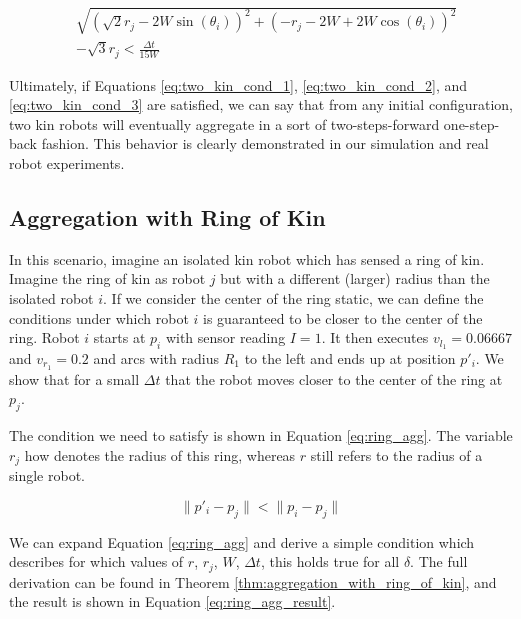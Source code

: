 \documentclass[conference]{IEEEtran}
\begin{document}
    \begin{equation} \label{eq:two_kin_cond_3}
      \begin{split}
        &\sqrt{(\sqrt{2}r_j - 2W\sin(\theta_i))^2 + (-r_j-2W+2W\cos(\theta_i))^2} \\
        & - \sqrt{3}r_j < \frac{\Delta t}{15W}
      \end{split}
    \end{equation}

    Ultimately, if Equations \eqref{eq:two_kin_cond_1}, \eqref{eq:two_kin_cond_2}, and \eqref{eq:two_kin_cond_3} are satisfied, we can say that from any initial configuration, two kin robots will eventually aggregate in a sort of two-steps-forward one-step-back fashion. This behavior is clearly demonstrated in our simulation and real robot experiments.

  \subsection{Aggregation with Ring of Kin}

    In this scenario, imagine an isolated kin robot which has sensed a ring of kin. Imagine the ring of kin as robot $j$ but with a different (larger) radius than the isolated robot $i$. If we consider the center of the ring static, we can define the conditions under which robot $i$ is guaranteed to be closer to the center of the ring. Robot $i$ starts at $p_i$ with sensor reading $I=1$. It then executes $v_{l_1} = 0.06667$ and $v_{r_1} = 0.2$ and arcs with radius $R_1$ to the left and ends up at position $p'_i$. We show that for a small $\Delta t$ that the robot moves closer to the center of the ring at $p_j$.

    The condition we need to satisfy is shown in Equation \eqref{eq:ring_agg}. The variable $r_j$ how denotes the radius of this ring, whereas $r$ still refers to the radius of a single robot.

    \begin{equation} \label{eq:ring_agg}
      \lVert p'_i - p_j \rVert < \lVert p_i - p_j \rVert
    \end{equation}

    We can expand Equation \eqref{eq:ring_agg} and derive a simple condition which describes for which values of $r$, $r_j$, $W$, $\Delta t$, this holds true for all $\delta$. The full derivation can be found in Theorem \ref{thm:aggregation_with_ring_of_kin}, and the result is shown in Equation \eqref{eq:ring_agg_result}.
\end{document}
